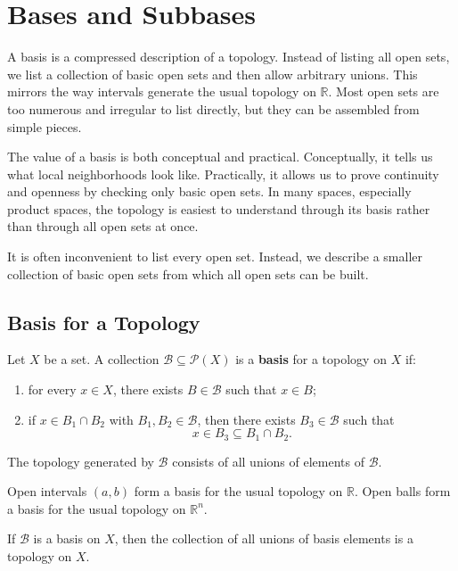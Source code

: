 \section{Bases and Subbases}


A basis is a compressed description of a topology. Instead of listing all open sets, we list a collection of basic open sets and then allow arbitrary unions. This mirrors the way intervals generate the usual topology on $\mathbb{R}$. Most open sets are too numerous and irregular to list directly, but they can be assembled from simple pieces.

The value of a basis is both conceptual and practical. Conceptually, it tells us what local neighborhoods look like. Practically, it allows us to prove continuity and openness by checking only basic open sets. In many spaces, especially product spaces, the topology is easiest to understand through its basis rather than through all open sets at once.

It is often inconvenient to list every open set. Instead, we describe a smaller collection of basic open sets from which all open sets can be built.

\subsection{Basis for a Topology}

\begin{definition}[Basis]
Let $X$ be a set. A collection $\mathcal{B}\subseteq\mathcal{P}(X)$ is a \textbf{basis} for a topology on $X$ if:
\begin{enumerate}
    \item for every $x\in X$, there exists $B\in\mathcal{B}$ such that $x\in B$;
    \item if $x\in B_1\cap B_2$ with $B_1,B_2\in\mathcal{B}$, then there exists $B_3\in\mathcal{B}$ such that
    \[
        x\in B_3\subseteq B_1\cap B_2.
    \]
\end{enumerate}
The topology generated by $\mathcal{B}$ consists of all unions of elements of $\mathcal{B}$.
\end{definition}

\begin{example}
Open intervals $(a,b)$ form a basis for the usual topology on $\mathbb{R}$. Open balls form a basis for the usual topology on $\mathbb{R}^n$.
\end{example}

\begin{proposition}
If $\mathcal{B}$ is a basis on $X$, then the collection of all unions of basis elements is a topology on $X$.
\end{proposition}

